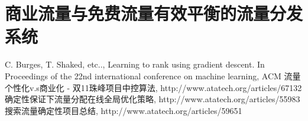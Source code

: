 \section{商业流量与免费流量有效平衡的流量分发系统} 


\begin{thebibliography}{99}
 C. Burges, T. Shaked, etc.., Learning to rank 
using gradient descent. In Proceedings of the 22nd international 
conference on machine learning, ACM
 流量个性化v.s商业化 - 双11珠峰项目中控算法, http://www.atatech.org/articles/67132
 确定性保证下流量分配在线全局优化策略, http://www.atatech.org/articles/55983
 搜索流量确定性项目总结, http://www.atatech.org/articles/59651
\end{thebibliography}

 

